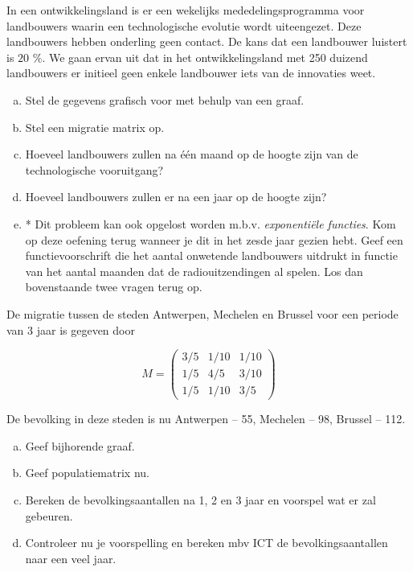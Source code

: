 \documentclass[12pt,twoside]{article}
\begin{document}
\begin{oefening}
In een ontwikkelingsland is er een wekelijks mededelingsprogramma voor landbouwers waarin een technologische evolutie wordt uiteengezet. Deze landbouwers hebben onderling geen contact. De kans dat een landbouwer luistert is $20$ \%. We gaan ervan uit dat in het ontwikkelingsland met 250 duizend landbouwers er initieel geen enkele landbouwer iets van de innovaties weet.

\begin{enumerate}[(a)]
  \item Stel de gegevens grafisch voor met behulp van een graaf.
  \item Stel een migratie matrix op.
  \item Hoeveel landbouwers zullen na één maand op de hoogte zijn van de technologische vooruitgang?
  \item Hoeveel landbouwers zullen er na een jaar op de hoogte zijn?
  \item * Dit probleem kan ook opgelost worden m.b.v. {\em exponentiële functies}. Kom op deze oefening terug wanneer je dit in het zesde jaar gezien hebt. Geef een functievoorschrift die het aantal onwetende landbouwers uitdrukt in functie van het aantal maanden dat de radiouitzendingen al spelen. Los dan bovenstaande twee vragen terug op.
\end{enumerate}
\end{oefening}

\begin{oefening}
De migratie tussen de steden Antwerpen, Mechelen en Brussel  voor een periode van 3 jaar
is gegeven door

$$M = \begin{pmatrix}
  3/5 & 1/10 & 1/10\\
  1/5 & 4/5  & 3/10\\
  1/5 & 1/10 & 3/5
\end{pmatrix}$$

De bevolking in deze steden is nu Antwerpen – 55, Mechelen – 98, Brussel – 112.

\begin{enumerate}[(a)]
  \item Geef bijhorende graaf.
  \item Geef populatiematrix nu.
  \item Bereken de bevolkingsaantallen na 1, 2 en 3 jaar en voorspel wat er zal gebeuren.
  \item Controleer nu je voorspelling en bereken mbv ICT de bevolkingsaantallen naar een veel jaar.
\end{enumerate}
\end{oefening}
\end{document}

